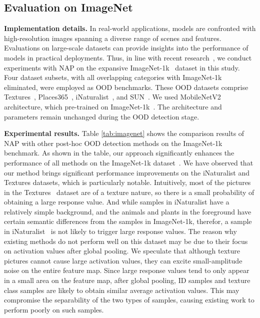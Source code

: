 \subsection{Evaluation on ImageNet}
\label{sec:imagenet}
\noindent \textbf{Implementation details.} In real-world applications, models are confronted with high-resolution images spanning a diverse range of scenes and features. Evaluations on large-scale datasets can provide insights into the performance of models in practical deployments. Thus, in line with recent research~\cite{sun2021react, sun2022dice, djurisic2022extremely}, we conduct experiments with NAP on the expansive ImageNet-1k~\cite{deng2009imagenet} dataset in this study. Four dataset subsets, with all overlapping categories with ImageNet-1k eliminated, were employed as OOD benchmarks. These OOD datasets comprise Textures~\cite{cimpoi2014texture}, Places365~\cite{zhou2017places}, iNaturalist~\cite{van2018inaturalist}, and SUN~\cite{xiao2010sun}. We used MobileNetV2~\cite{sandler2018mobilenetv2} architecture, which pre-trained on ImageNet-1k~\cite{deng2009imagenet}. The architecture and parameters remain unchanged during the OOD detection stage.

\noindent \textbf{Experimental results.} Table \ref{tab:imagenet} shows the comparison results of NAP with other post-hoc OOD detection methods on the ImageNet-1k~\cite{deng2009imagenet} benchmark. As shown in the table, our approach significantly enhances the performance of all methods on the ImageNet-1k dataset~\cite{deng2009imagenet}. We have observed that our method brings significant performance improvements on the iNaturalist and Textures datasets, which is particularly notable. Intuitively, most of the pictures in the Textures~\cite{cimpoi2014texture} dataset are of a texture nature, so there is a small probability of obtaining a large response value. And while samples in iNaturalist have a relatively simple background, and the animals and plants in the foreground have certain semantic differences from the samples in ImageNet-1k, therefor, a sample in iNaturalist~\cite{van2018inaturalist} is not likely to trigger large response values. The reason why existing methods do not perform well on this dataset may be due to their focus on activation values after global pooling. We speculate that although texture pictures cannot cause large activation values, they can excite small-amplitude noise on the entire feature map. Since large response values tend to only appear in a small area on the feature map, after global pooling, ID samples and texture class samples are likely to obtain similar average activation values. This may compromise the separability of the two types of samples, causing existing work to perform poorly on such samples.

